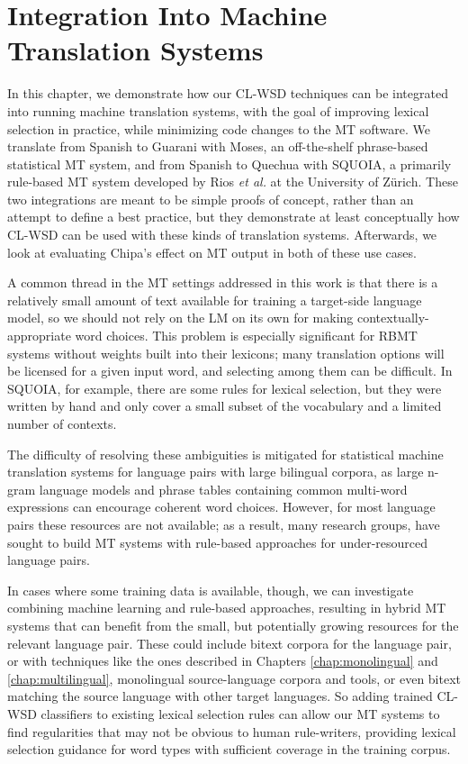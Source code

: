 \chapter{Integration Into Machine Translation Systems}
\label{chap:integration}
In this chapter, we demonstrate how our CL-WSD techniques can be integrated
into running machine translation systems, with the goal of improving lexical
selection in practice, while minimizing code changes to the MT software. We
translate from Spanish to Guarani with Moses\cite{koehn-EtAl:2007:PosterDemo},
an off-the-shelf phrase-based statistical MT system, and from Spanish to
Quechua with SQUOIA\cite{rios2015basic}, a primarily rule-based MT system 
developed by Rios \emph{et al.} at the University of Zürich. These two
integrations are meant to be simple proofs of concept, rather than an attempt
to define a best practice, but they demonstrate at least conceptually how
CL-WSD can be used with these kinds of translation systems. Afterwards, we look
at evaluating Chipa's effect on MT output in both of these use cases.

A common thread in the MT settings addressed in this work is that there is a
relatively small amount of text available for training a target-side language
model, so we should not rely on the LM on its own for making
contextually-appropriate word choices. This problem is especially significant
for RBMT systems without weights built into their lexicons; many translation
options will be licensed for a given input word, and selecting among them can
be difficult. In SQUOIA, for example, there are some rules for lexical
selection, but they were written by hand and only cover a small subset of the
vocabulary and a limited number of contexts.

The difficulty of resolving these ambiguities is mitigated for statistical
machine translation systems for language pairs with large bilingual corpora, as
large n-gram language models and phrase tables containing common multi-word
expressions can encourage coherent word choices. However, for most language
pairs these resources are not available; as a result, many research groups,
have sought to build MT systems with rule-based approaches for under-resourced
language pairs.

In cases where some training data is available, though, we can investigate
combining machine learning and rule-based approaches, resulting in hybrid MT
systems that can benefit from the small, but potentially growing resources for
the relevant language pair. These could include bitext corpora for the language
pair, or with techniques like the ones described in Chapters
\ref{chap:monolingual} and \ref{chap:multilingual}, monolingual source-language
corpora and tools, or even bitext matching the source language with other
target languages. So adding trained CL-WSD classifiers to existing lexical
selection rules can allow our MT systems to find regularities that may not be
obvious to human rule-writers, providing lexical selection guidance for word
types with sufficient coverage in the training corpus.

